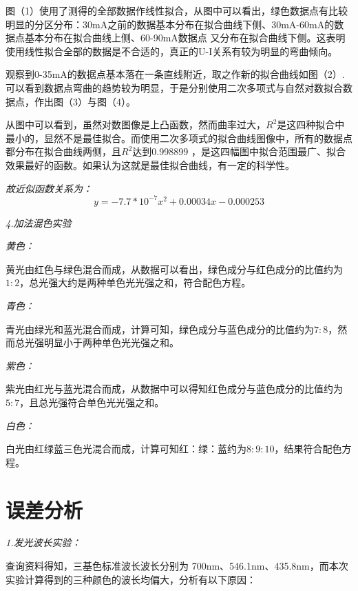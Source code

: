 \documentclass[UTF8]{ctexart}
\begin{document}
    图（1）使用了测得的全部数据作线性拟合，从图中可以看出，绿色数据点有比较明显的分区分布：30mA之前的数据基本分布在拟合曲线下侧、30mA-60mA的数据点基本分布在拟合曲线上侧、60-90mA数据点
    又分布在拟合曲线下侧。这表明使用线性拟合全部的数据是不合适的，真正的U-I关系有较为明显的弯曲倾向。

    观察到0-35mA的数据点基本落在一条直线附近，取之作新的拟合曲线如图（2）.可以看到数据点弯曲的趋势较为明显，于是分别使用二次多项式与自然对数拟合数据点，作出图（3）与图（4）。

    从图中可以看到，虽然对数图像是上凸函数，然而曲率过大，$R^2$是这四种拟合中最小的，显然不是最佳拟合。而使用二次多项式的拟合曲线图像中，所有的数据点都分布在拟合曲线两侧，且$R^2$达到0.998899
    ，是这四幅图中拟合范围最广、拟合效果最好的函数。如果认为这就是最佳拟合曲线，有一定的科学性。

    \emph{故近似函数关系为：}
    \begin{equation*}
        y=-7.7*10^{-7}x^2+0.00034x-0.000253
    \end{equation*}

    \begin{center}
        \emph{4.加法混色实验}
    \end{center}

    \emph{黄色：}

    黄光由红色与绿色混合而成，从数据可以看出，绿色成分与红色成分的比值约为$1:2$，总光强大约是两种单色光光强之和，符合配色方程。

    \emph{青色：}

    青光由绿光和蓝光混合而成，计算可知，绿色成分与蓝色成分的比值约为$7:8$，然而总光强明显小于两种单色光光强之和。

    \emph{紫色：}

    紫光由红光与蓝光混合而成，从数据中可以得知红色成分与蓝色成分的比值约为$5:7$，且总光强符合单色光光强之和。

    \emph{白色：}

    白光由红绿蓝三色光混合而成，计算可知红：绿：蓝约为$8:9:10$，结果符合配色方程。

    \section{误差分析}

    \emph{1.发光波长实验：}

    查询资料得知，三基色标准波长波长分别为 700nm、546.1nm、435.8nm，而本次实验计算得到的三种颜色的波长均偏大，分析有以下原因：
\end{document}
